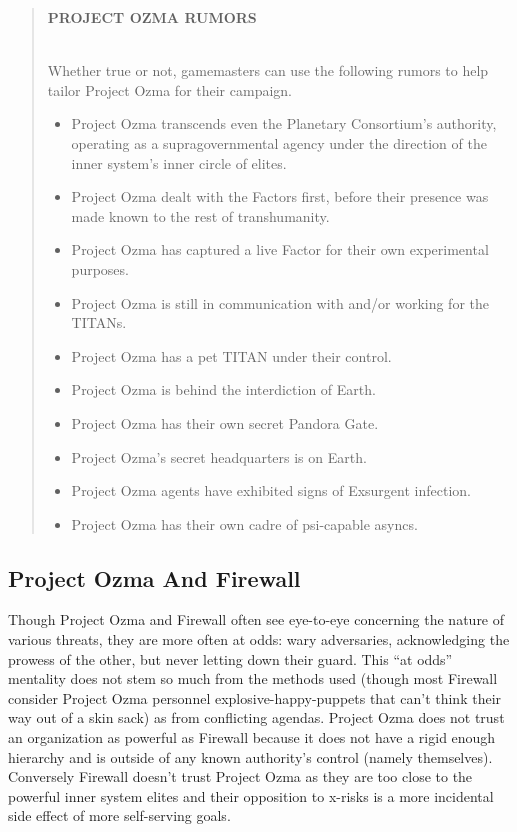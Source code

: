 \begin{quotation}
\begin{large}
\textbf{PROJECT OZMA RUMORS}
\end{large} \\
Whether true or not, gamemasters can use the
following rumors to help tailor Project Ozma for
their campaign.
\begin{itemize}
\item Project Ozma transcends even the Planetary
Consortium’s authority, operating as a supragovernmental
agency under the direction of
the inner system’s inner circle of elites.
\item Project Ozma dealt with the Factors first, before
their presence was made known to the
rest of transhumanity.
\item Project Ozma has captured a live Factor for
their own experimental purposes.
\item Project Ozma is still in communication with and/or working for the TITANs.
\item Project Ozma has a pet TITAN under their
control.
\item Project Ozma is behind the interdiction of Earth.
\item Project Ozma has their own secret
Pandora Gate.
\item Project Ozma’s secret headquarters is on Earth.
\item Project Ozma agents have exhibited signs of
Exsurgent infection.
\item Project Ozma has their own cadre of psi-capable
asyncs.
\end{itemize}
\end{quotation}

\subsection{Project Ozma And Firewall }

Though Project Ozma and Firewall often see eye-to-eye
concerning the nature of various threats, they are
more often at odds: wary adversaries, acknowledging 
the prowess of the other, but never letting down their 
guard. This ``at odds'' mentality does not stem so much 
from the methods used (though most Firewall consider 
Project Ozma personnel explosive-happy-puppets that 
can't think their way out of a skin sack) as from 
conflicting agendas. Project Ozma does not trust an 
organization as powerful as Firewall because it does 
not have a rigid enough hierarchy and is outside of any 
known authority's control (namely themselves). Conversely
Firewall doesn't trust Project Ozma as they are
too close to the powerful inner system elites and their 
opposition to x-risks is a more incidental side effect of 
more self-serving goals.

